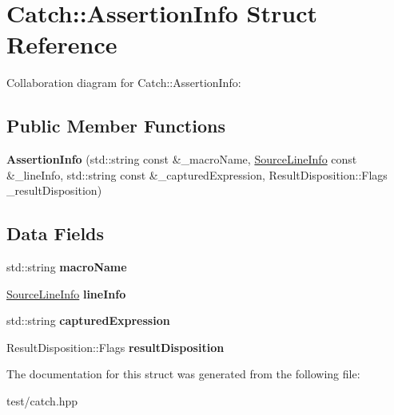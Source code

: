 \hypertarget{structCatch_1_1AssertionInfo}{}\section{Catch\+:\+:Assertion\+Info Struct Reference}
\label{structCatch_1_1AssertionInfo}


Collaboration diagram for Catch\+:\+:Assertion\+Info\+:
\subsection*{Public Member Functions}
\begin{DoxyCompactItemize}
\item 
{\bfseries Assertion\+Info} (std\+::string const \&\+\_\+macro\+Name, \hyperlink{structCatch_1_1SourceLineInfo}{Source\+Line\+Info} const \&\+\_\+line\+Info, std\+::string const \&\+\_\+captured\+Expression, Result\+Disposition\+::\+Flags \+\_\+result\+Disposition)\hypertarget{structCatch_1_1AssertionInfo_aaf6cc3eebd40391e54d37ed42953c73f}{}\label{structCatch_1_1AssertionInfo_aaf6cc3eebd40391e54d37ed42953c73f}

\end{DoxyCompactItemize}
\subsection*{Data Fields}
\begin{DoxyCompactItemize}
\item 
std\+::string {\bfseries macro\+Name}\hypertarget{structCatch_1_1AssertionInfo_ac2e59e8c89e00eb3390768f50d540b18}{}\label{structCatch_1_1AssertionInfo_ac2e59e8c89e00eb3390768f50d540b18}

\item 
\hyperlink{structCatch_1_1SourceLineInfo}{Source\+Line\+Info} {\bfseries line\+Info}\hypertarget{structCatch_1_1AssertionInfo_a17bdbb404ba12658034f833be2f4c3e7}{}\label{structCatch_1_1AssertionInfo_a17bdbb404ba12658034f833be2f4c3e7}

\item 
std\+::string {\bfseries captured\+Expression}\hypertarget{structCatch_1_1AssertionInfo_af7c1d3cbfa346e9a303030fa0ef0cb54}{}\label{structCatch_1_1AssertionInfo_af7c1d3cbfa346e9a303030fa0ef0cb54}

\item 
Result\+Disposition\+::\+Flags {\bfseries result\+Disposition}\hypertarget{structCatch_1_1AssertionInfo_a60353b3632ab2f827162f2b2d6911073}{}\label{structCatch_1_1AssertionInfo_a60353b3632ab2f827162f2b2d6911073}

\end{DoxyCompactItemize}


The documentation for this struct was generated from the following file\+:\begin{DoxyCompactItemize}
\item 
test/catch.\+hpp\end{DoxyCompactItemize}
